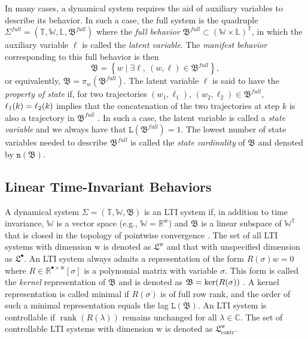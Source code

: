 \documentclass[11pt,print,draftcls,onecolumn,romanappendices]{ieeecolor}
\DeclareMathOperator{\rank}{rank}
\newcommand{\W}{\mathbb{W}}
\newcommand{\T}{\mathbb{T}}
\newcommand{\R}{\mathbb{R}}
\newcommand{\LTI}[1]{\mathfrak{L}^{#1}}
\newcommand{\n}[1]{\mathtt{n}\left(#1\right)}
\newcommand{\lag}[1]{\mathtt{L}\left(#1\right)}
\newcommand{\proj}[2]{\pi_{#1}\left(#2\right)}
\newcommand{\revise}[1]{{\color{black} #1}}
\newcommand{\B}{\mathfrak{B}}
\begin{document}
In many cases, a dynamical system requires the aid of auxiliary variables to describe its behavior. In such a case, the full system is the quadruple $\Sigma^{full}=(\T,\W,\mathbb{L},\B^{full})$ where the \emph{full behavior} $\B^{full}\subset(\W\times\mathbb{L})^\T$, in which the auxiliary variable $\ell$ is called the \emph{latent variable}. The \emph{manifest behavior} corresponding to this full behavior is then
\begin{equation}\label{eq:manifestbehavior}
	\B=\left\{w\mid \exists \ell, \ (w,\ell)\in\B^{full}\right\},
\end{equation}
or equivalently, $\B=\proj{w}{\B^{full}}$. The latent variable $\ell$ is said to have the \emph{property of state} if, for two trajectories $(w_1,\ell_1)$, $(w_2,\ell_2)\in\B^{full}$, $\ell_1\revise{(k)}=\ell_2\revise{(k)}$ implies that the concatenation of the two trajectories at step $k$ is also a trajectory in $\B^{full}$ \cite{Polderman:1998}. In such a case, the latent variable is called a \emph{state variable} and we always have that $\lag{\B^{full}}=1$. The lowest number of state variables needed to describe $\B^{full}$ is called the \emph{state cardinality} of $\B$ and denoted by $\n{\B}$.

\subsection{Linear Time-Invariant Behaviors}
A dynamical system $\Sigma=(\T,\W,\B)$ is an LTI system if, in addition to time invariance, $\W$ is a vector space (e.g., $\W=\R^\mathrm{w}$) and $\B$ is a linear subspace of $\W^\T$ \revise{that is closed in the topology of pointwise convergence} \cite{Willems:2005,Markovsky:2006}. The set of all LTI systems with dimension $\mathrm{w}$ is denoted as $\LTI{\mathrm{w}}$ and that with unspecified dimension as $\LTI{\bullet}$. An LTI system always admits a representation of the form $R(\sigma)w=0$ where $R\in\mathbb{R}^{\bullet\times\mathrm{w}}[\sigma]$ is a polynomial matrix with variable $\sigma$. This form is called the \emph{kernel} representation of $\B$ and is denoted as $\B=\revise{\ker(R(\sigma))}$ \cite{Polderman:1998}. A kernel representation is called minimal if $R(\sigma)$ is of full row rank, and the order of such a minimal representation equals the lag $\lag{\B}$. An LTI system is controllable if $\rank(R(\lambda))$ remains unchanged for all $\lambda\in\mathbb{C}$. The set of controllable LTI systems with dimension $\mathrm{w}$ is denoted as $\LTI{\mathrm{w}}_\mathrm{contr}$. 
\end{document}
